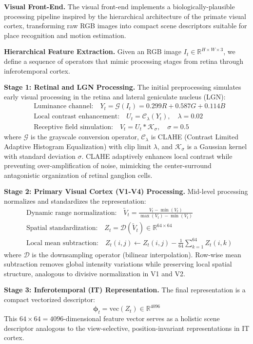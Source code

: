 \textbf{Visual Front-End.} The visual front-end implements a biologically-plausible processing pipeline inspired by the hierarchical architecture of the primate visual cortex, transforming raw RGB images into compact scene descriptors suitable for place recognition and motion estimation.

\textbf{Hierarchical Feature Extraction.} Given an RGB image $I_t\in\mathbb{R}^{H\times W\times 3}$, we define a sequence of operators that mimic processing stages from retina through inferotemporal cortex.

\textbf{Stage 1: Retinal and LGN Processing.} The initial preprocessing simulates early visual processing in the retina and lateral geniculate nucleus (LGN):
\begin{align}
     & \text{Luminance channel:}\quad Y_t = \mathcal{G}(I_t) = 0.299R+0.587G+0.114B              \\
     & \text{Local contrast enhancement:}\quad U_t = \mathcal{C}_\lambda(Y_t),\quad \lambda=0.02 \\
     & \text{Receptive field simulation:}\quad V_t = U_t * \mathcal{K}_\sigma,\quad \sigma=0.5
\end{align}
where $\mathcal{G}$ is the grayscale conversion operator, $\mathcal{C}_\lambda$ is CLAHE (Contrast Limited Adaptive Histogram Equalization) with clip limit $\lambda$, and $\mathcal{K}_\sigma$ is a Gaussian kernel with standard deviation $\sigma$. CLAHE adaptively enhances local contrast while preventing over-amplification of noise, mimicking the center-surround antagonistic organization of retinal ganglion cells.

\textbf{Stage 2: Primary Visual Cortex (V1-V4) Processing.} Mid-level processing normalizes and standardizes the representation:
\begin{align}
     & \text{Dynamic range normalization:}\quad \tilde V_t = \frac{V_t-\min(V_t)}{\max(V_t)-\min(V_t)}     \\
     & \text{Spatial standardization:}\quad Z_t = \mathcal{D}(\tilde V_t)\in\mathbb{R}^{64\times64}        \\
     & \text{Local mean subtraction:}\quad Z_t(i,j)\leftarrow Z_t(i,j)-\frac{1}{64}\sum_{k=1}^{64}Z_t(i,k)
\end{align}
where $\mathcal{D}$ is the downsampling operator (bilinear interpolation). Row-wise mean subtraction removes global intensity variations while preserving local spatial structure, analogous to divisive normalization in V1 and V2.

\textbf{Stage 3: Inferotemporal (IT) Representation.} The final representation is a compact vectorized descriptor:
\begin{equation}
    \boldsymbol{\phi}_t=\mathrm{vec}(Z_t)\in\mathbb{R}^{4096}
\end{equation}
This $64 \times 64 = 4096$-dimensional feature vector serves as a holistic scene descriptor analogous to the view-selective, position-invariant representations in IT cortex.

